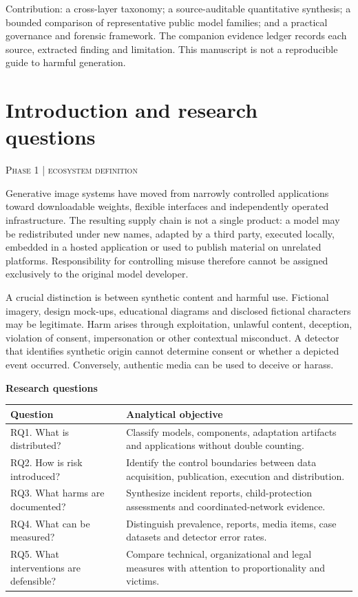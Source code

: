 \documentclass[11pt,a4paper]{article}
\newcommand{\sect}[2]{\section{#1}\textcolor{muted}{\small\textsc{#2}}\par\vspace{2mm}}
\newcommand{\sub}[1]{\vspace{1mm}\textbf{#1}\par}
\begin{document}
Contribution: a cross-layer taxonomy; a source-auditable quantitative synthesis; a bounded comparison of representative public model families; and a practical governance and forensic framework. The companion evidence ledger records each source, extracted finding and limitation. This manuscript is not a reproducible guide to harmful generation.


\clearpage\sect{Introduction and research questions}{Phase 1 | ecosystem definition}

Generative image systems have moved from narrowly controlled applications toward downloadable weights, flexible interfaces and independently operated infrastructure. The resulting supply chain is not a single product: a model may be redistributed under new names, adapted by a third party, executed locally, embedded in a hosted application or used to publish material on unrelated platforms. Responsibility for controlling misuse therefore cannot be assigned exclusively to the original model developer.


A crucial distinction is between synthetic content and harmful use. Fictional imagery, design mock-ups, educational diagrams and disclosed fictional characters may be legitimate. Harm arises through exploitation, unlawful content, deception, violation of consent, impersonation or other contextual misconduct. A detector that identifies synthetic origin cannot determine consent or whether a depicted event occurred. Conversely, authentic media can be used to deceive or harass. \cite{nist,fbi}


\sub{Research questions}

\begin{center}\small\begin{tabularx}{\linewidth}{@{}YY@{}}\toprule
\textbf{Question} & \textbf{Analytical objective}\\\midrule
RQ1. What is distributed? & Classify models, components, adaptation artifacts and applications without double counting.\\
RQ2. How is risk introduced? & Identify the control boundaries between data acquisition, publication, execution and distribution.\\
RQ3. What harms are documented? & Synthesize incident reports, child-protection assessments and coordinated-network evidence.\\
RQ4. What can be measured? & Distinguish prevalence, reports, media items, case datasets and detector error rates.\\
RQ5. What interventions are defensible? & Compare technical, organizational and legal measures with attention to proportionality and victims.\\\bottomrule\end{tabularx}\end{center}
\end{document}
